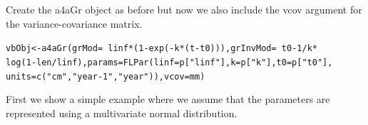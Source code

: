 \documentclass[a4paper,english,10pt]{article}\usepackage[]{graphicx}\usepackage[]{color}
\makeatletter
\newcommand{\hlnum}[1]{\textcolor[rgb]{0.063,0.58,0.627}{#1}}%
\newcommand{\hlstr}[1]{\textcolor[rgb]{0.063,0.58,0.627}{#1}}%
\newcommand{\hlopt}[1]{\textcolor[rgb]{0.196,0.196,0.196}{#1}}%
\newcommand{\hlstd}[1]{\textcolor[rgb]{0.196,0.196,0.196}{#1}}%
\newcommand{\hlkwb}[1]{\textcolor[rgb]{0.627,0,0.314}{#1}}%
\newcommand{\hlkwc}[1]{\textcolor[rgb]{0,0.631,0.314}{#1}}%
\newcommand{\hlkwd}[1]{\textcolor[rgb]{0.78,0.227,0.412}{#1}}%
\newenvironment{kframe}{%
 \def\at@end@of@kframe{}%
 \ifinner\ifhmode%
  \def\at@end@of@kframe{\end{minipage}}%
  \begin{minipage}{\columnwidth}%
 \fi\fi%
 \def\FrameCommand##1{\hskip\@totalleftmargin \hskip-\fboxsep
 \colorbox{shadecolor}{##1}\hskip-\fboxsep
     \hskip-\linewidth \hskip-\@totalleftmargin \hskip\columnwidth}%
 \MakeFramed {\advance\hsize-\width
   \@totalleftmargin\z@ \linewidth\hsize
   \@setminipage}}%
 {\par\unskip\endMakeFramed%
 \at@end@of@kframe}
\newenvironment{knitrout}{}{} %
\makeatother
\begin{document}
Create the a4aGr object as before but now we also include the vcov argument for the variance-covariance matrix.
\begin{knitrout}
\color{fgcolor}\begin{kframe}
\begin{alltt}
\hlstd{vbObj} \hlkwb{<-} \hlkwd{a4aGr}\hlstd{(}\hlkwc{grMod} \hlstd{=} \hlopt{~}\hlstd{linf} \hlopt{*} \hlstd{(}\hlnum{1} \hlopt{-} \hlkwd{exp}\hlstd{(}\hlopt{-}\hlstd{k} \hlopt{*} \hlstd{(t} \hlopt{-} \hlstd{t0))),} \hlkwc{grInvMod} \hlstd{=} \hlopt{~}\hlstd{t0} \hlopt{-} \hlnum{1}\hlopt{/}\hlstd{k} \hlopt{*}
    \hlkwd{log}\hlstd{(}\hlnum{1} \hlopt{-} \hlstd{len}\hlopt{/}\hlstd{linf),} \hlkwc{params} \hlstd{=} \hlkwd{FLPar}\hlstd{(}\hlkwc{linf} \hlstd{= p[}\hlstr{"linf"}\hlstd{],} \hlkwc{k} \hlstd{= p[}\hlstr{"k"}\hlstd{],} \hlkwc{t0} \hlstd{= p[}\hlstr{"t0"}\hlstd{],}
    \hlkwc{units} \hlstd{=} \hlkwd{c}\hlstd{(}\hlstr{"cm"}\hlstd{,} \hlstr{"year-1"}\hlstd{,} \hlstr{"year"}\hlstd{)),} \hlkwc{vcov} \hlstd{= mm)}
\end{alltt}
\end{kframe}
\end{knitrout}

First we show a simple example where we assume that the parameters are represented using a multivariate normal distribution.
\end{document}
